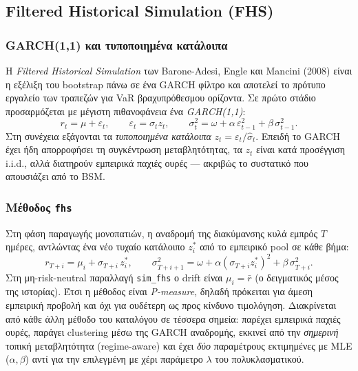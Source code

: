 \documentclass[12pt]{article}
\begin{document}
\subsection{Filtered Historical Simulation (FHS)}
\label{sec:fhs}

\subsubsection{GARCH(1,1) και τυποποιημένα κατάλοιπα}
Η \emph{Filtered Historical Simulation} των Barone-Adesi, Engle και Mancini (2008) είναι η εξέλιξη του bootstrap πάνω σε ένα GARCH φίλτρο και αποτελεί το πρότυπο εργαλείο των τραπεζών για VaR βραχυπρόθεσμου ορίζοντα. Σε πρώτο στάδιο προσαρμόζεται με μέγιστη πιθανοφάνεια ένα \emph{GARCH(1,1)}:
\[
  r_t = \mu + \varepsilon_t, \qquad \varepsilon_t = \sigma_t z_t, \qquad
  \sigma_t^{2} = \omega + \alpha\, \varepsilon_{t-1}^{2} + \beta\, \sigma_{t-1}^{2}.
\]
Στη συνέχεια εξάγονται τα \emph{τυποποιημένα κατάλοιπα} $z_t = \varepsilon_t / \hat\sigma_t$. Επειδή το GARCH έχει ήδη απορροφήσει τη συγκέντρωση μεταβλητότητας, τα $z_t$ είναι κατά προσέγγιση i.i.d., αλλά διατηρούν εμπειρικά παχιές ουρές — ακριβώς το συστατικό που απουσιάζει από το BSM.

\subsubsection{Μέθοδος \texttt{fhs}}
Στη φάση παραγωγής μονοπατιών, η αναδρομή της διακύμανσης κυλά εμπρός $T$ ημέρες, αντλώντας ένα νέο τυχαίο κατάλοιπο $z^{*}_i$ από το εμπειρικό pool σε κάθε βήμα:
\[
  r_{T+i} = \mu_i + \sigma_{T+i}\, z^{*}_i, \qquad
  \sigma_{T+i+1}^{2} = \omega + \alpha (\sigma_{T+i} z^{*}_i)^{2} + \beta\, \sigma_{T+i}^{2}.
\]
Στη μη-risk-neutral παραλλαγή \texttt{sim\_fhs} ο drift είναι $\mu_i = \bar r$ (ο δειγματικός μέσος της ιστορίας). Έτσι η μέθοδος είναι \emph{P-measure}, δηλαδή πρόκειται για άμεση εμπειρική προβολή και όχι για ουδέτερη ως προς κίνδυνο τιμολόγηση. Διακρίνεται από κάθε άλλη μέθοδο του καταλόγου σε τέσσερα σημεία: παρέχει εμπειρικά παχιές ουρές, παράγει clustering μέσω της GARCH αναδρομής, εκκινεί από την \emph{σημερινή} τοπική μεταβλητότητα (regime-aware) και έχει \emph{δύο} παραμέτρους εκτιμημένες με MLE ($\alpha,\beta$) αντί για την επιλεγμένη με χέρι παράμετρο $\lambda$ του πολυκλασματικού.
\end{document}
